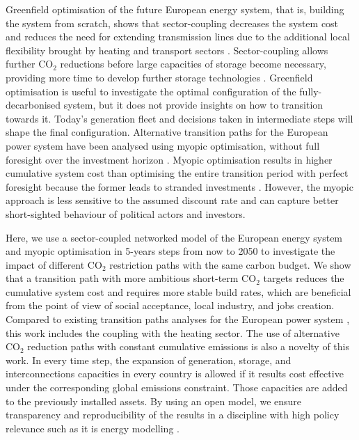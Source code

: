 \documentclass[5p]{elsarticle} %
\begin{document}
Greenfield optimisation of the future European energy system, that is, building the system from scratch, shows that sector-coupling decreases the system cost and reduces the need for extending transmission lines due to the additional local flexibility brought by heating and transport sectors \cite{Brown_2018}. Sector-coupling allows further CO$_2$ reductions before large capacities of storage become necessary, providing more time to develop further storage technologies \cite{Victoria_storage}. Greenfield optimisation is useful to investigate the optimal configuration of the fully-decarbonised system, but it does not provide insights on how to transition towards it. Today's generation fleet and decisions taken in intermediate steps will shape the final configuration. 
Alternative transition paths for the European power system have been analysed using myopic optimisation, without full foresight over the investment horizon \cite{Bogdanov_2019, Plesmann_2017, Gerbaulet_2019, Poncelet_2016}. Myopic optimisation results in higher cumulative system cost than optimising the entire transition period with perfect foresight because the former leads to stranded investments \cite{Gerbaulet_2019, Heuberger_2018}. However, the myopic approach is less sensitive to the assumed discount rate and can capture better short-sighted behaviour of political actors and investors. 

Here, we use a sector-coupled networked model of the European energy system and myopic optimisation in 5-years steps from now to 2050 to investigate the impact of different CO$_2$ restriction paths with the same carbon budget. We show that a transition path with more ambitious short-term CO$_2$ targets reduces the cumulative system cost and requires more stable build rates, which are beneficial from the point of view of social acceptance, local industry, and jobs creation. Compared to existing transition paths analyses for the European power system \cite{Plesmann_2017, Gerbaulet_2019, Poncelet_2016}, this work includes the coupling with the heating sector. The use of alternative CO$_2$ reduction paths with constant cumulative emissions is also a novelty of this work.  In every time step, the expansion of generation, storage, and interconnections capacities in every country is allowed  if it results cost effective under the corresponding global emissions constraint. Those capacities are added to the previously installed assets. By using an open model, we ensure transparency and reproducibility of the results in a  discipline with high policy relevance such as it is energy modelling \cite{Pfenninger_2017, Pfenninger_2018}. 
\end{document}
